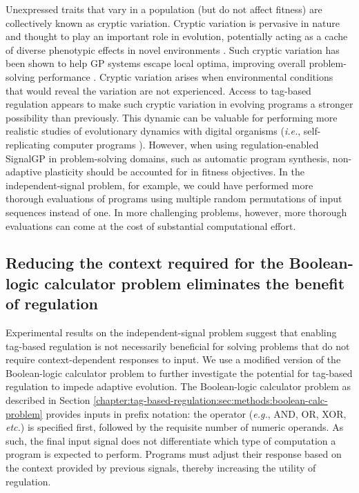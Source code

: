 Unexpressed traits that vary in a population (but do not affect fitness) are collectively known as cryptic variation. 
Cryptic variation is pervasive in nature and thought to play an important role in evolution, potentially acting as a cache of diverse phenotypic effects in novel environments \citep{gibson_uncovering_2004,paaby_cryptic_2014}.
Such cryptic variation has been shown to help GP systems escape local optima, improving overall problem-solving performance \citep{turner_neutral_2015}.
Cryptic variation arises when environmental conditions that would reveal the variation are not experienced. 
Access to tag-based regulation appears to make such cryptic variation in evolving programs a stronger possibility than previously.
This dynamic can be valuable for performing more realistic studies of evolutionary dynamics with digital organisms (\textit{i.e.}, self-replicating computer programs \citep{wilke_biology_2002}).
However, when using regulation-enabled SignalGP in problem-solving domains, such as automatic program synthesis, non-adaptive plasticity should be accounted for in fitness objectives.
In the independent-signal problem, for example, we could have performed more thorough evaluations of programs using multiple random permutations of input sequences instead of one.
In more challenging problems, however, more thorough evaluations can come at the cost of substantial computational effort. 

\subsection{Reducing the context required for the Boolean-logic calculator problem eliminates the benefit of regulation}

Experimental results on the independent-signal problem suggest that enabling tag-based regulation is not necessarily beneficial for solving problems that do not require context-dependent responses to input. 
We use a modified version of the Boolean-logic calculator problem to further investigate the potential for tag-based regulation to impede adaptive evolution. 
The Boolean-logic calculator problem as described in Section \ref{chapter:tag-based-regulation:sec:methods:boolean-calc-problem} provides inputs in prefix notation: the operator (\textit{e.g.}, AND, OR, XOR, \textit{etc.}) is specified first, followed by the requisite number of numeric operands. 
As such, the final input signal does not differentiate which type of computation a program is expected to perform. %
Programs must adjust their response based on the context provided by previous signals, thereby increasing the utility of regulation. 

